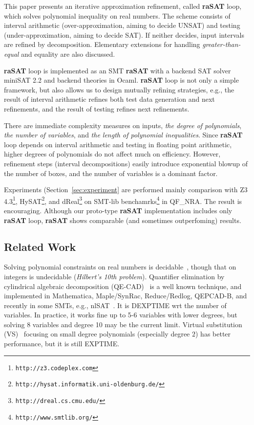 \documentclass[runningheads,a4paper,oribibl]{llncs}
\begin{document}
This paper presents an iterative approximation refinement, called {\bf raSAT} loop, 
which solves polynomial inequality on real numbers.
The scheme consists of interval arithmetic 
(over-approximation, aiming to decide UNSAT) and 
testing (under-approximation, aiming to decide SAT). 
If neither decides, input intervals are refined by decomposition. 
Elementary extensions for handling {\em greater-than-equal} and equality are also 
discussed. 

{\bf raSAT} loop is implemented as an SMT {\bf raSAT} with 
a backend SAT solver miniSAT 2.2 and backend theories in Ocaml. 
{\bf raSAT} loop is not only a simple framework, but also allows us to design 
mutually refining strategies, e.g., the result of interval arithmetic refines 
both test data generation and next refinements, and the result of testing 
refines next refinements. 

There are immediate complexity measures on inputs, {\em the degree of polynomials}, 
{\em the number of variables}, and {\em the length of polynomial inequalities}. 
Since {\bf raSAT} loop depends on interval arithmetic and testing 
in floating point arithmetic,
higher degrees of polynomials do not affect much on efficiency. 
However, refinement steps (interval decompositions) easily introduce exponential blowup of 
the number of boxes, and the number of variables is a dominant factor. 

Experiments (Section~\ref{sec:experiment} are performed mainly comparison with 
Z3 4.3\footnote{\tt http://z3.codeplex.com}, 
HySAT\footnote{\tt http://hysat.informatik.uni-oldenburg.de/}, 
and dReal\footnote{\tt http://dreal.cs.cmu.edu/} on 
SMT-lib benchamrks\footnote{\tt http://www.smtlib.org/} in QF\_NRA. 
The result is encouraging. 
Although our proto-type {\bf raSAT} implementation includes only {\bf raSAT} loop, 
{\bf raSAT} shows comparable (and sometimes outperfoming) results. 

\subsection*{Related Work} \label{sec:relate}

Solving polynomial constraints on real numbers is decidable~\cite{tarski}, 
though that on integers is undecidable ({\em Hilbert's 10th problem}). 
Quantifier elimination by cylindrical algebraic decomposition (QE-CAD)~\cite{qecad} 
is a well known technique, and 
implemented in Mathematica, Maple/SynRac, Reduce/Redlog, QEPCAD-B, and recently 
in some SMTs, e.g., nlSAT~\cite{Jovanovic13}. 
It is DEXPTIME wrt the number of variables. In practice, it works fine up to 5-6 variables 
with lower degrees, but solving 8 variables and degree 10 may be the current limit. 
Virtual substitution (VS)~\cite{vsmethod} focusing on small degree polynomials 
(especially degree $2$) has better performance, but it is still EXPTIME. 
\end{document}
